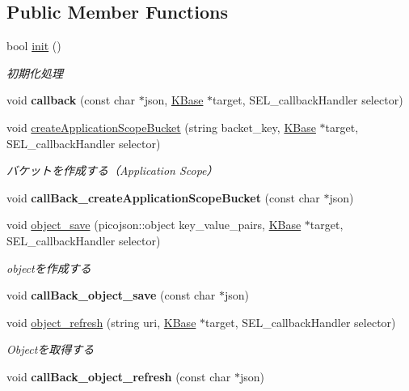 \subsection*{Public Member Functions}
\begin{DoxyCompactItemize}
\item 
bool \hyperlink{class_c_kii_bucket_ae687c3b2a7e95b6e425303c9d944d35b}{init} ()
\begin{DoxyCompactList}\small\item\em 初期化処理 \end{DoxyCompactList}\item 
\hypertarget{class_c_kii_bucket_a804e004c2f2ea7afe5550b7d272f544d}{void {\bfseries callback} (const char $\ast$json, \hyperlink{class_k_base}{K\-Base} $\ast$target, S\-E\-L\-\_\-callback\-Handler selector)}\label{class_c_kii_bucket_a804e004c2f2ea7afe5550b7d272f544d}

\item 
void \hyperlink{class_c_kii_bucket_a2b6be0d9902c9ccf15537c82ddd88f0b}{create\-Application\-Scope\-Bucket} (string backet\-\_\-key, \hyperlink{class_k_base}{K\-Base} $\ast$target, S\-E\-L\-\_\-callback\-Handler selector)
\begin{DoxyCompactList}\small\item\em バケットを作成する（\-Application Scope） \end{DoxyCompactList}\item 
\hypertarget{class_c_kii_bucket_a260a88c89b192ba5cf2c64b5a99d7dac}{void {\bfseries call\-Back\-\_\-create\-Application\-Scope\-Bucket} (const char $\ast$json)}\label{class_c_kii_bucket_a260a88c89b192ba5cf2c64b5a99d7dac}

\item 
void \hyperlink{class_c_kii_bucket_abafb1fd324be6e4bd460ff41d9973f5c}{object\-\_\-save} (picojson\-::object key\-\_\-value\-\_\-pairs, \hyperlink{class_k_base}{K\-Base} $\ast$target, S\-E\-L\-\_\-callback\-Handler selector)
\begin{DoxyCompactList}\small\item\em objectを作成する \end{DoxyCompactList}\item 
\hypertarget{class_c_kii_bucket_a57b3dfbce914b0d8ef38145be32f79b3}{void {\bfseries call\-Back\-\_\-object\-\_\-save} (const char $\ast$json)}\label{class_c_kii_bucket_a57b3dfbce914b0d8ef38145be32f79b3}

\item 
void \hyperlink{class_c_kii_bucket_a8525528021e4b069823345ce458b2812}{object\-\_\-refresh} (string uri, \hyperlink{class_k_base}{K\-Base} $\ast$target, S\-E\-L\-\_\-callback\-Handler selector)
\begin{DoxyCompactList}\small\item\em Objectを取得する \end{DoxyCompactList}\item 
\hypertarget{class_c_kii_bucket_ae5fd5045697030cdce7d004fb7e26bc4}{void {\bfseries call\-Back\-\_\-object\-\_\-refresh} (const char $\ast$json)}\label{class_c_kii_bucket_ae5fd5045697030cdce7d004fb7e26bc4}


\end{DoxyCompactItemize}
